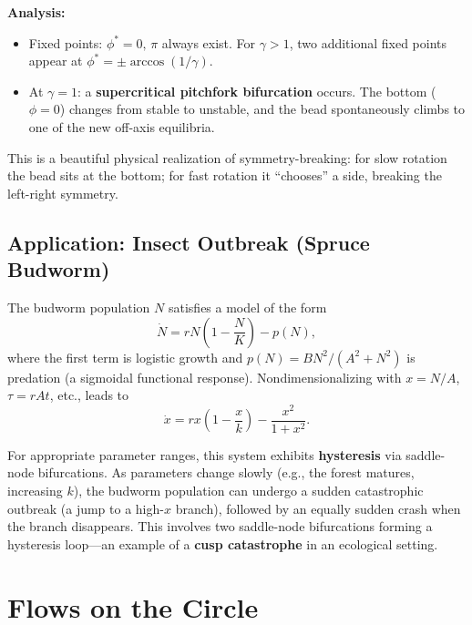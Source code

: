 \documentclass[11pt,letterpaper]{article}
\theoremstyle{definition}
\theoremstyle{plain}
\theoremstyle{remark}
\begin{document}
\textbf{Analysis:}
\begin{itemize}[leftmargin=2em]
\item Fixed points: $\phi^* = 0,\,\pi$ always exist.  For $\gamma > 1$,
      two additional fixed points appear at $\phi^* = \pm\arccos(1/\gamma)$.
\item At $\gamma = 1$: a \textbf{supercritical pitchfork bifurcation}
      occurs.  The bottom ($\phi=0$) changes from stable to unstable,
      and the bead spontaneously climbs to one of the new off-axis
      equilibria.
\end{itemize}

This is a beautiful physical realization of symmetry-breaking: for slow
rotation the bead sits at the bottom; for fast rotation it ``chooses'' a
side, breaking the left-right symmetry.

\subsection{Application: Insect Outbreak (Spruce Budworm)}

The budworm population $N$ satisfies a model of the form
\begin{equation}
  \dot{N} = rN\!\left(1 - \frac{N}{K}\right) - p(N),
\end{equation}
where the first term is logistic growth and $p(N) = BN^2/(A^2+N^2)$ is
predation (a sigmoidal functional response).  Nondimensionalizing
with $x = N/A$, $\tau = rAt$, etc., leads to
\begin{equation}
  \dot{x} = rx\!\left(1 - \frac{x}{k}\right) - \frac{x^2}{1+x^2}.
\end{equation}

For appropriate parameter ranges, this system exhibits \textbf{hysteresis}
via saddle-node bifurcations.  As parameters change slowly (e.g., the
forest matures, increasing $k$), the budworm population can undergo a
sudden catastrophic outbreak (a jump to a high-$x$ branch), followed by
an equally sudden crash when the branch disappears.  This involves two
saddle-node bifurcations forming a hysteresis loop---an example of a
\textbf{cusp catastrophe} in an ecological setting.


\section{Flows on the Circle}\label{sec:flows-circle}
\end{document}
